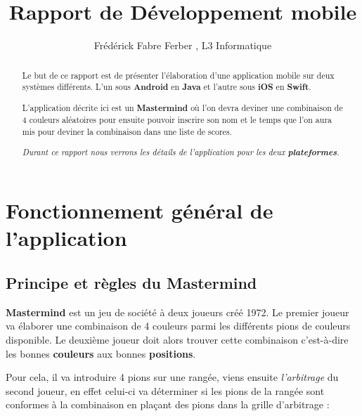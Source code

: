 \documentclass{article}
\title{Rapport de Développement mobile}
\author{Fr\'ed\'erick Fabre Ferber , L3 Informatique}
\begin{document}
\maketitle

\begin{abstract}

Le but de ce rapport est de présenter l'élaboration d'une application mobile sur deux systèmes différents. 
L'un sous \textbf{Android} en \textbf{Java} et l'autre sous \textbf{iOS} en \textbf{Swift}.

\vspace{1\baselineskip}

L’application décrite ici est un \textbf{Mastermind} où l'on devra deviner une combinaison de 4 couleurs aléatoires pour ensuite pouvoir inscrire son nom et le temps que l'on aura mis pour deviner la combinaison dans une liste de scores. 

\vspace{1\baselineskip}

\textit{Durant ce rapport nous verrons les détails de l'application pour les deux \textbf{plateformes}.}

\end{abstract}

\section{Fonctionnement général de l'application}

\subsection{Principe et règles du Mastermind}
\label{subsection : Principe et règles du Mastermind}

\textbf{Mastermind} est un jeu de société à deux joueurs créé 1972. Le premier joueur va élaborer une combinaison de 4 couleurs parmi les différents pions de couleurs disponible. Le deuxième joueur doit alors trouver cette combinaison c'est-à-dire les bonnes \textbf{couleurs} aux bonnes \textbf{positions}. 

\vspace{1\baselineskip}

Pour cela, il va introduire 4 pions sur une rangée, viens ensuite \textit{l'arbitrage} du second joueur, en effet celui-ci va déterminer si les pions de la rangée sont conformes à la combinaison en plaçant des pions dans la grille d'arbitrage : 

\vspace{1\baselineskip}
\end{document}
